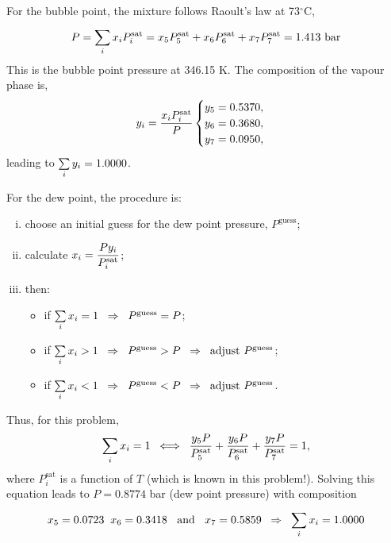 \begin{enumerate}[1)]
   For the bubble point, the mixture follows Raoult's law at 73$^{\circ}$C,
      \begin{displaymath}
          P = \summation[x_{i}P_{i}^{\text{sat}}]{i}{} = x_{5}P_{5}^{\text{sat}} + x_{6}P_{6}^{\text{sat}} + x_{7}P_{7}^{\text{sat}} = 1.413\text{ bar}
      \end{displaymath}
      This is the bubble point pressure at 346.15 K. The composition of the vapour phase is,
      \begin{displaymath}
             y_{i}=\frc{x_{i}P_{i}^{\text{sat}}}{P}
             \begin{cases}
                  y_{5} = 0.5370,\\
                  y_{6} = 0.3680,\\
                  y_{7} = 0.0950,
             \end{cases}
      \end{displaymath}
      leading to $\summation[y_{i}]{i}{} = 1.0000$.

\medskip

     For the dew point, the procedure is:
    \begin{enumerate}[i)]
       \item choose an initial guess for the dew point pressure, $P^{\text{guess}}$;
       \item calculate $x_{i}=\frc{Py_{i}}{P_{i}^{\text{sat}}}$;
       \item then:
           \begin{itemize}
              \item if $\summation[x_{i}]{i}{} = 1 \;\;\Rightarrow \;\; P^{\text{guess}} = P$;
              \item if $\summation[x_{i}]{i}{} > 1 \;\;\Rightarrow \;\; P^{\text{guess}} > P \;\; \Rightarrow\;\; \text{adjust } P^{\text{guess}}$;
              \item if $\summation[x_{i}]{i}{} < 1 \;\;\Rightarrow \;\; P^{\text{guess}} < P \;\; \Rightarrow\;\; \text{adjust } P^{\text{guess}}$.
           \end{itemize}
    \end{enumerate}
    Thus, for this problem,
    \begin{displaymath}
        \summation[x_{i}]{i}{} = 1\;\; \Longleftrightarrow \;\; \frc{y_{5}P}{P_{5}^{\text{sat}}} + \frc{y_{6}P}{P_{6}^{\text{sat}}} + \frc{y_{7}P}{P_{7}^{\text{sat}}} = 1,
    \end{displaymath}
    where $P_{i}^{\text{sat}}$ is a function of $T$ (which is known in this problem!).  Solving this equation leads to $P=0.8774$ bar (dew point pressure) with composition
    \begin{displaymath}
        x_{5} =0.0723\;\; x_{6} = 0.3418\;\;\text{ and }\;\;x_{7} = 0.5859\;\;\Rightarrow\;\; \summation[x_{i}]{i}{} = 1.0000
    \end{displaymath}



\end{enumerate}
